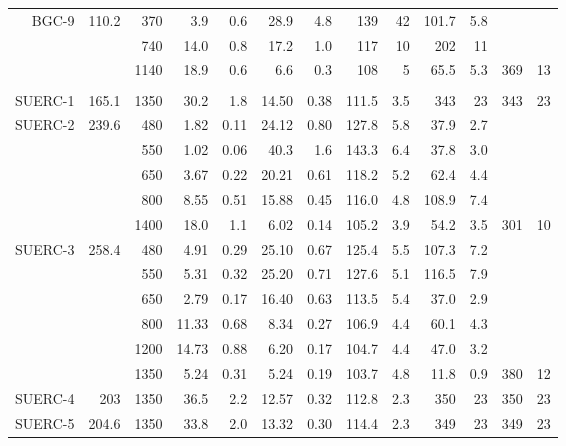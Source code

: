 \documentclass[authoryear,review,12pt]{elsarticle}
\begin{document}
\begin{table}
\begin{tabular}{|r|rrrrrrrrrrrr|}
    BGC-9 & 110.2 & 370   & 3.9   & 0.6   & 28.9  & 4.8   & 139   & 42    & 101.7 & 5.8   &       &  \\
          &       & 740   & 14.0  & 0.8   & 17.2  & 1.0   & 117   & 10    & 202   & 11    &       &  \\
          &       & 1140  & 18.9  & 0.6   & 6.6   & 0.3   & 108   & 5     & 65.5  & 5.3   & 369   & 13 \\
          &       &       &       &       &       &       &       &       &       &       &       &  \\
    SUERC-1 & 165.1 & 1350  & 30.2  & 1.8   & 14.50 & 0.38  & 111.5 & 3.5   & 343   & 23    & 343   & 23 \\
    SUERC-2 & 239.6 & 480   & 1.82  & 0.11  & 24.12 & 0.80  & 127.8 & 5.8   & 37.9  & 2.7   &       &  \\
          &       & 550   & 1.02  & 0.06  & 40.3  & 1.6   & 143.3 & 6.4   & 37.8  & 3.0   &       &  \\
          &       & 650   & 3.67  & 0.22  & 20.21 & 0.61  & 118.2 & 5.2   & 62.4  & 4.4   &       &  \\
          &       & 800   & 8.55  & 0.51  & 15.88 & 0.45  & 116.0 & 4.8   & 108.9 & 7.4   &       &  \\
          &       & 1400  & 18.0  & 1.1   & 6.02  & 0.14  & 105.2 & 3.9   & 54.2  & 3.5   & 301   & 10 \\
    SUERC-3 & 258.4 & 480   & 4.91  & 0.29  & 25.10 & 0.67  & 125.4 & 5.5   & 107.3 & 7.2   &       &  \\
          &       & 550   & 5.31  & 0.32  & 25.20 & 0.71  & 127.6 & 5.1   & 116.5 & 7.9   &       &  \\
          &       & 650   & 2.79  & 0.17  & 16.40 & 0.63  & 113.5 & 5.4   & 37.0  & 2.9   &       &  \\
          &       & 800   & 11.33 & 0.68  & 8.34  & 0.27  & 106.9 & 4.4   & 60.1  & 4.3   &       &  \\
          &       & 1200  & 14.73 & 0.88  & 6.20  & 0.17  & 104.7 & 4.4   & 47.0  & 3.2   &       &  \\
          &       & 1350  & 5.24  & 0.31  & 5.24  & 0.19  & 103.7 & 4.8   & 11.8  & 0.9   & 380   & 12 \\
    SUERC-4 & 203   & 1350  & 36.5  & 2.2   & 12.57 & 0.32  & 112.8 & 2.3   & 350   & 23    & 350   & 23 \\
    SUERC-5 & 204.6 & 1350  & 33.8  & 2.0   & 13.32 & 0.30  & 114.4 & 2.3   & 349   & 23    & 349   & 23 \\

\end{tabular}
\end{table}
\end{document}
